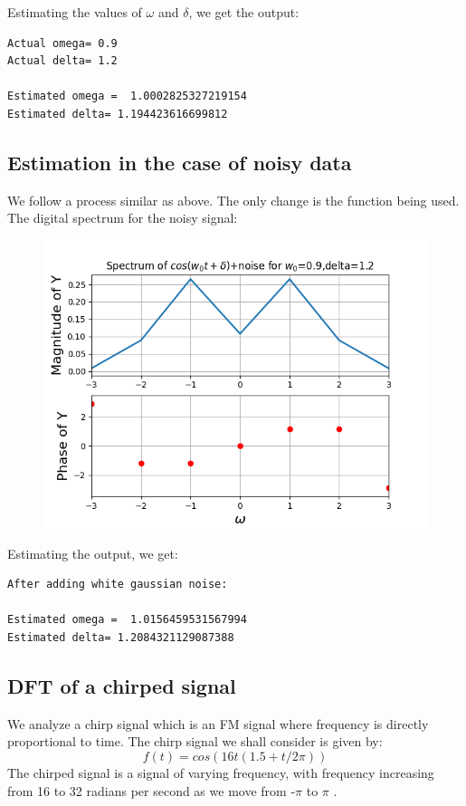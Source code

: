 \documentclass[11pt, a4paper]{article}
\begin{document}
Estimating the values of $\omega$ and $\delta$, we get the output:
\begin{verbatim}
Actual omega= 0.9
Actual delta= 1.2 

Estimated omega =  1.0002825327219154
Estimated delta= 1.194423616699812
\end{verbatim}

\subsection*{Estimation in the case of noisy data}
We follow a process similar as above. The only change is the function being used.
\newline
The digital spectrum for the noisy signal:
\begin{figure}[!tbh]
\centering
\includegraphics[scale=0.7]{assgn10_plot11.png} 
\label{fig11}
\end{figure}

Estimating the output, we get:
\begin{verbatim}
After adding white gaussian noise: 

Estimated omega =  1.0156459531567994
Estimated delta= 1.2084321129087388
\end{verbatim}

\subsection*{DFT of a chirped signal}
We analyze a chirp signal which is an FM signal where frequency is directly proportional to time. The chirp signal we shall consider is given by:
\begin{equation*}
 f(t)=cos(16t(1.5+t/2\pi))
\end{equation*}
The chirped signal is a signal of varying frequency, with frequency increasing from 16 to 32 radians per second as we move from -$\pi$ to $\pi$ .
\end{document}
